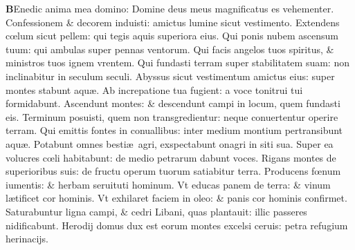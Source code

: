 \documentclass[a5paper,10pt]{book}
\def\ae{æ}
\def\oe{œ}
\begin{document}
\begin{multicols*}{2}
\lettrine[lines=2]{\bfseries \color{red} B}{}Enedic anima mea domino: Domine deus meus magnificatus es vehementer.
\newline \color{red} C\color{black}onfessionem \& decorem induisti: amictus lumine sicut vestimento.
\newline \color{red} E\color{black}xtendens c\oe lum sicut pellem: qui tegis aquis superiora eius.
\newline \color{red} Q\color{black}ui ponis nubem ascensum tuum: qui ambulas super pennas ventorum.
\newline \color{red} Q\color{black}ui facis angelos tuos spiritus, \& ministros tuos ignem vrentem.
\newline \color{red} Q\color{black}ui fundasti terram super stabilitatem suam: non inclinabitur in seculum seculi.
\newline \color{red} A\color{black}byssus sicut vestimentum amictus eius: super montes stabunt aqu\ae .
\newline \color{red} A\color{black}b increpatione tua fugient: a voce tonitrui tui formidabunt.
\newline \color{red} A\color{black}scendunt montes: \& descendunt campi in locum, quem fundasti eis.
\newline \color{red} T\color{black}erminum posuisti, quem non transgredientur: neque conuertentur operire terram.
\newline \color{red} Q\color{black}ui emittis fontes in conuallibus: inter medium montium pertransibunt aqu\ae .
\newline \color{red} P\color{black}otabunt omnes besti\ae \ agri, exspectabunt onagri in siti sua.
\newline \color{red} S\color{black}uper ea volucres c\oe li habitabunt: de medio petrarum dabunt voces.
\newline \color{red} R\color{black}igans montes de superioribus suis: de fructu operum tuorum satiabitur terra.
\newline \color{red} P\color{black}roducens f\oe num iumentis: \& herbam seruituti hominum.
\newline \color{red} V\color{black}t educas panem de terra: \& vinum l\ae tificet cor hominis.
\newline \color{red} V\color{black}t exhilaret faciem in oleo: \& panis cor hominis confirmet.
\newline \color{red} S\color{black}aturabuntur ligna campi, \& cedri Libani, quas plantauit: illic passeres nidificabunt.
\newline \color{red} H\color{black}erodij domus dux est eorum montes excelsi ceruis: petra refugium herinacijs.

\end{multicols*}
\end{document}
